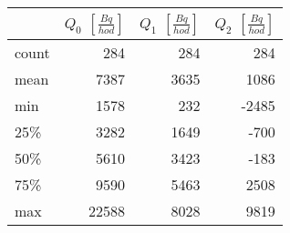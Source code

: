\begin{tabular}{lrrr}
\toprule
{} &  $Q_0$ $\left[\si{\frac{Bq}{hod}}\right]$ &  $Q_1$ $\left[\si{\frac{Bq}{hod}}\right]$ &  $Q_2$ $\left[\si{\frac{Bq}{hod}}\right]$ \\
\midrule
count &                                       284 &                                       284 &                                       284 \\
mean  &                                      7387 &                                      3635 &                                      1086 \\
min   &                                      1578 &                                       232 &                                     -2485 \\
25\%   &                                      3282 &                                      1649 &                                      -700 \\
50\%   &                                      5610 &                                      3423 &                                      -183 \\
75\%   &                                      9590 &                                      5463 &                                      2508 \\
max   &                                     22588 &                                      8028 &                                      9819 \\
\bottomrule
\end{tabular}
